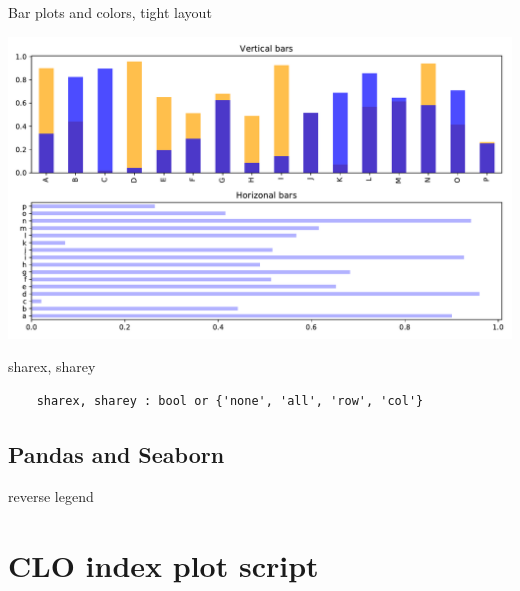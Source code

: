 \begin{frame}[fragile]
  {Bar plots and colors, tight layout}

\scriptsize


  \includegraphics[width=.7\textwidth]{codes/visualization/bar_plots.pdf}
\end{frame}

\begin{frame}[fragile]
    {sharex, sharey}

\scriptsize


\vfill
\normalsize
\begin{Verbatim}
    sharex, sharey : bool or {'none', 'all', 'row', 'col'}
\end{Verbatim}
\end{frame}

\subsection{Pandas and Seaborn}

\begin{frame}
    {reverse legend}
\end{frame}

\section{CLO index plot script}


